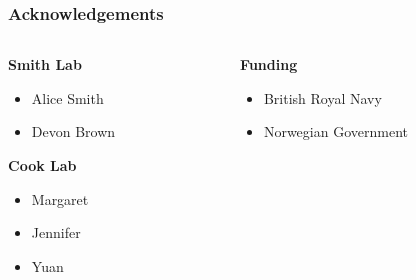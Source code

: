 \documentclass[
	11pt, %
]{beamer}
\begin{document}
\begin{frame}
	\frametitle{Acknowledgements}
	
	\begin{columns}[t] %
		\begin{column}{0.45\textwidth} %
			\textbf{Smith Lab}
			\begin{itemize}
				\item Alice Smith
				\item Devon Brown
			\end{itemize}
			\textbf{Cook Lab}
			\begin{itemize}
				\item Margaret
				\item Jennifer
				\item Yuan
			\end{itemize}
		\end{column}		
		\begin{column}{0.5\textwidth} %
			\textbf{Funding}
			\begin{itemize}
				\item British Royal Navy
				\item Norwegian Government
			\end{itemize}
		\end{column}
	\end{columns}
\end{frame}
\end{document}
